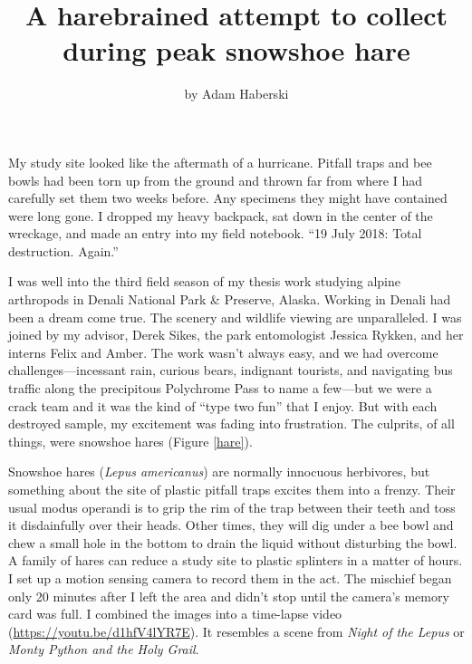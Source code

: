 \title{A harebrained attempt to collect during peak snowshoe hare}

\subtitle{}

\author{by Adam Haberski}

\maketitle

My study site looked like the aftermath of a hurricane. Pitfall traps and bee bowls had been torn up from the ground and thrown far from where I had carefully set them two weeks before. Any specimens they might have contained were long gone. I dropped my heavy backpack, sat down in the center of the wreckage, and made an entry into my field notebook. “19 July 2018: Total destruction. Again.”

I was well into the third field season of my thesis work studying alpine arthropods in Denali National Park \& Preserve, Alaska. Working in Denali had been a dream come true. The scenery and wildlife viewing are unparalleled. I was joined by my advisor, Derek Sikes, the park entomologist Jessica Rykken, and her interns Felix and Amber. The work wasn’t always easy, and we had overcome challenges---incessant rain, curious bears, indignant tourists, and navigating bus traffic along the precipitous Polychrome Pass to name a few---but we were a crack team and it was the kind of  “type two fun” that I enjoy. But with each destroyed sample, my excitement was fading into frustration. The culprits, of all things, were snowshoe hares (Figure \ref{hare}).

Snowshoe hares (\textit{Lepus americanus}) are normally innocuous herbivores, but something about the site of plastic pitfall traps excites them into a frenzy. Their usual modus operandi is to grip the rim of the trap between their teeth and toss it disdainfully over their heads. Other times, they will dig under a bee bowl and chew a small hole in the bottom to drain the liquid without disturbing the bowl. A family of hares can reduce a study site to plastic splinters in a matter of hours. I set up a motion sensing camera to record them in the act. The mischief began only 20 minutes after I left the area and didn’t stop until the camera’s memory card was full. I combined the images into a time-lapse video (\url{https://youtu.be/d1hfV4lYR7E}). It resembles a scene from \textit{Night of the Lepus} or \textit{Monty Python and the Holy Grail}.

